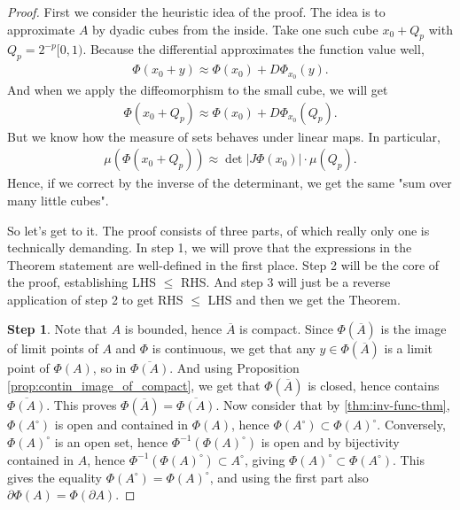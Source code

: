 \begin{proof}
	First we consider the heuristic idea of the proof.
	The idea is to approximate $A$ by dyadic cubes from the inside. Take one such cube $x_{0} + Q_{p}$ with $Q_{p} = 2^{-p}[0,1)$. Because the differential approximates the function value well,
	\begin{align*}
		\Phi(x_{0} + y ) \approx \Phi(x_{0}) + D \Phi_{x_{0}}(y).
	\end{align*}
	And when we apply the diffeomorphism to the small cube, we will get
	\begin{align*}
		\Phi(x_{0} + Q_{p}) \approx \Phi(x_{0}) + D \Phi_{x_{0}}(Q_{p}).
	\end{align*}
	But we know how the measure of sets behaves under linear maps. In particular,
	\begin{align*}
		\mu(\Phi(x_{0} + Q_{p})) \approx \det \left| J \Phi(x_{0}) \right| \cdot \mu( Q_{p}).
	\end{align*}
	Hence, if we correct by the inverse of the determinant, we get the same "sum over many little cubes".

	So let's get to it. The proof consists of three parts, of which really only one is technically demanding. In step 1, we will prove that the expressions in the Theorem statement are well-defined in the first place. Step 2 will be the core of the proof, establishing LHS $\leq$ RHS. And step 3 will just be a reverse application of step 2 to get RHS $\leq$ LHS and then we get the Theorem.

	\textbf{Step 1}. Note that $A$ is bounded, hence $\overline{ A } $ is compact. Since $\Phi(\overline{ A } )$ is the image of limit points of $A$ and $\Phi$ is continuous, we get that any $y \in \Phi(\overline{ A } )$ is a limit point of $\Phi(A)$, so in $\overline{ \Phi(A) } $. And using Proposition \ref{prop:contin_image_of_compact}, we get that $\Phi( \overline{ A } )$ is closed, hence contains $\overline{ \Phi  (A) }$. This proves $\Phi(\overline{ A } ) = \overline{ \Phi(A) } $. Now consider that by \ref{thm:inv-func-thm}, $\Phi(A^{\circ })$ is open and contained in $\Phi(A)$, hence $\Phi(A^{\circ }) \subset \Phi(A)^{\circ }$. Conversely, $\Phi(A)^{\circ }$ is an open set, hence $\Phi^{-1}(\Phi(A)^{\circ })$ is open and by bijectivity contained in $A$, hence $\Phi^{-1}(\Phi(A)^{\circ }) \subset A^{\circ }$, giving $\Phi(A)^{\circ } \subset \Phi(A^{\circ })$. This gives the equality $\Phi(A^{\circ }) = \Phi(A)^{\circ }$, and using the first part also $\partial \Phi(A) = \Phi(\partial A)$.


\end{proof}
